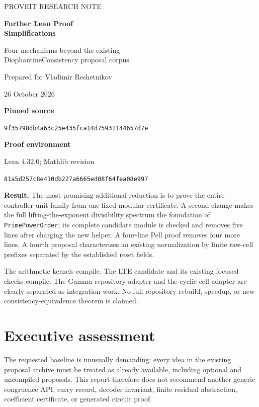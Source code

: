 \documentclass[11pt]{article}
\newcommand{\code}[1]{\nolinkurl{#1}}
\newcommand{\commit}{\texttt{9f35798db4a63c25e435fca14d75931144657d7e}}
\begin{document}
\begin{titlepage}
\vspace*{0.8cm}
{\color{accent}\large PROVEIT RESEARCH NOTE}\par
\vspace{0.5cm}
{\color{ink}\Huge\bfseries Further Lean Proof\\[4pt] Simplifications}\par
\vspace{0.5cm}
{\Large Four mechanisms beyond the existing\\DiophantineConsistency proposal corpus}\par
\vspace{0.8cm}
{\large Prepared for Vladimir Reshetnikov}\par
26 October 2026\par
\vspace{0.8cm}
\textbf{Pinned source}\par
\commit\par
\textbf{Proof environment}\par
Lean 4.32.0; Mathlib revision\par
\code{81a5d257c8e410db227a6665ed08f64fea08e997}\par
\vfill
\begin{minipage}{0.95\textwidth}
\textbf{Result.} The most promising additional reduction is to prove the entire
controller-unit family from one fixed modular certificate. A second change
makes the full lifting-the-exponent divisibility spectrum the foundation of
\code{PrimePowerOrder}; its complete candidate module is checked and removes
five lines after charging the new helper. A four-line Pell proof removes four
more lines. A fourth proposal characterizes an existing normalization by finite
raw-cell prefixes separated by the established reset fields.

The arithmetic kernels compile. The LTE candidate and its existing focused
checks compile. The Gamma repository adapter and the cyclic-cell adapter are
clearly separated as integration work. No full repository rebuild, speedup,
or new consistency-equivalence theorem is claimed.
\end{minipage}
\end{titlepage}

\section*{Executive assessment}
The requested baseline is unusually demanding: every idea in the existing
proposal archive must be treated as already available, including optional and
uncompiled proposals. This report therefore does not recommend another generic
congruence API, carry record, decoder invariant, finite residual abstraction,
coefficient certificate, or generated circuit proof.
\end{document}
